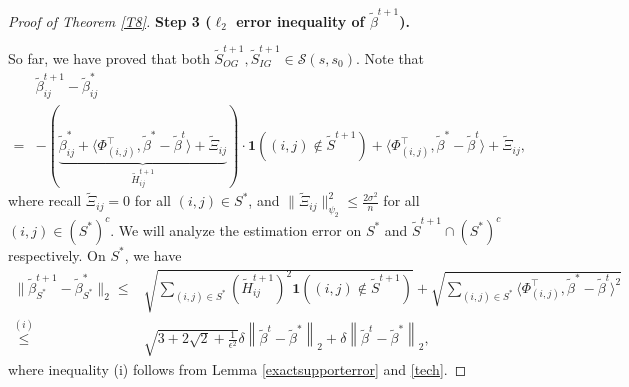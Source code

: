 \documentclass[12pt]{article}
\newtheorem{proof}{Proof}
\begin{document}
\begin{appendix}
\begin{proof}[Proof of Theorem \ref{T8}]
\textbf{Step 3 ($\ell_2$ error inequality of $\tilde \beta^{t+1}$).} 

So far, we have proved that both $ \tilde S_{OG}^{t+1}, \tilde S_{IG}^{t+1} \in \mathcal S(s,s_0) $. 
Note that
\begin{equation}
\begin{aligned}
    &\tilde \beta_{ij}^{t+1} - \tilde \beta_{ij}^* \\
    =& - (\underbrace{\tilde\beta_{ij}^* + \langle{\Phi}_{(i,j)}^\top, \tilde\beta^* - \tilde\beta^{t} \rangle + \tilde\Xi_{ij}}_{\tilde H_{ij}^{t+1}}) \cdot \mathbf1 \left( (i,j) \notin \tilde S^{t+1} \right) + \langle{\Phi}_{(i,j)}^\top, \tilde\beta^* - \tilde\beta^{t} \rangle + \tilde\Xi_{ij},
\end{aligned}
\end{equation}
where recall $ \tilde\Xi_{ij} =0$ for all $ (i,j)\in S^*$, and $ \|\tilde\Xi_{ij}\|_{\psi_2}^2 \le \frac{2\sigma^2}{n}$ for all $ (i,j)\in (S^*)^c$.
We will analyze the estimation error on $S^*$ and $\tilde S^{t+1} \cap (S^*)^c$ respectively. On $S^*$, we have
\begin{equation}\label{eq:exactS*}
\begin{aligned}
\|\tilde \beta_{S^*}^{t+1} - \tilde\beta_{S^*}^* \|_2 
\le& \sqrt{ \sum_{(i,j) \in S^*} \left( \tilde H_{ij}^{t+1} \right)^2 \mathbf1 \left( (i,j) \notin \tilde S^{t+1} \right)}
  + \sqrt{\sum_{(i,j) \in S^*} \langle{\Phi}_{(i,j)}^\top, \tilde\beta^* - \tilde\beta^{t} \rangle^2 }  \\
\overset{(i)}{\le} & \sqrt{ 3+2\sqrt2+\frac1{\epsilon^2} } \delta \left\| \tilde\beta^t - \tilde\beta^* \right\|_2 
  + \delta \left\| \tilde\beta^t - \tilde\beta^* \right\|_2 ,
\end{aligned}
\end{equation}
where inequality (i) follows from Lemma \ref{exactsupporterror} and \eqref{tech}. 


\end{proof}
\end{appendix}
\end{document}
